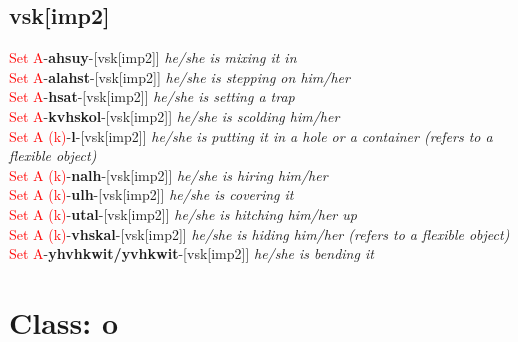 \documentclass[oneside,openany]{book}%
\begin{document}
\subsection*{vsk[imp2]}%
\textcolor{Red}{Set A}{-}\textbf{ahsuy}{-}[vsk[imp2]] \textit{ he/she is mixing it in} \\%
\textcolor{Red}{Set A}{-}\textbf{alahst}{-}[vsk[imp2]] \textit{ he/she is stepping on him/her} \\%
\textcolor{Red}{Set A}{-}\textbf{hsat}{-}[vsk[imp2]] \textit{ he/she is setting a trap} \\%
\textcolor{Red}{Set A}{-}\textbf{kvhskol}{-}[vsk[imp2]] \textit{ he/she is scolding him/her} \\%
\textcolor{Red}{Set A (k)}{-}\textbf{l}{-}[vsk[imp2]] \textit{ he/she is putting it in a hole or a container (refers to a flexible object)} \\%
\textcolor{Red}{Set A (k)}{-}\textbf{nalh}{-}[vsk[imp2]] \textit{ he/she is hiring him/her} \\%
\textcolor{Red}{Set A (k)}{-}\textbf{ulh}{-}[vsk[imp2]] \textit{ he/she is covering it} \\%
\textcolor{Red}{Set A (k)}{-}\textbf{utal}{-}[vsk[imp2]] \textit{ he/she is hitching him/her up} \\%
\textcolor{Red}{Set A (k)}{-}\textbf{vhskal}{-}[vsk[imp2]] \textit{ he/she is hiding him/her (refers to a flexible object)} \\%
\textcolor{Red}{Set A}{-}\textbf{yhvhkwit/yvhkwit}{-}[vsk[imp2]] \textit{ he/she is bending it} \\%
\vspace{1em}%
\needspace{3in}%
\section*{Class: o}%
%
\needspace{1in}%
\end{document}
